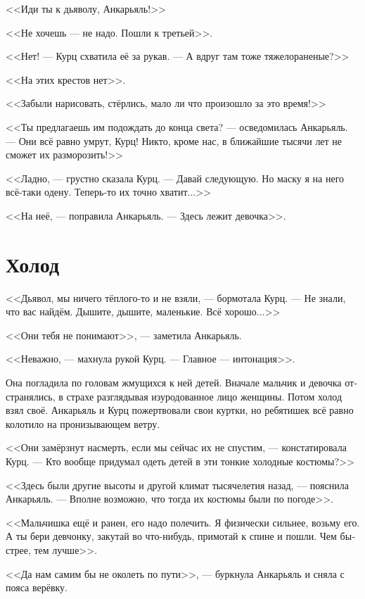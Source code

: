 \documentclass[a4paper,10pt,fleqn]{book}\usepackage{polyglossia}\setdefaultlanguage[babelshorthands=true]{russian}\setotherlanguage{english}\defaultfontfeatures{Ligatures=TeX,Mapping=tex-text}\usepackage{xcolor}\newcommand{\ml}[3]{#2}
\begin{document}
\ml{$0$}
{<<Иди ты к дьяволу, Анкарьяль!>>}
{``Fuck yourself, Angaralle!''}

\ml{$0$}
{<<Не хочешь --- не надо.}
{``Take it, or leave it.}
Пошли к третьей>>.

<<Нет! --- Курц схватила её за рукав.
--- А вдруг там тоже тяжелораненые?>>

<<На этих крестов нет>>.

<<Забыли нарисовать, стёрлись, мало ли что произошло за это время!>>

<<Ты предлагаешь им подождать до конца света? --- осведомилась Анкарьяль.
--- Они всё равно умрут, Курц!
Никто, кроме нас, в ближайшие тысячи лет не сможет их разморозить!>>

<<Ладно, --- грустно сказала Курц.
--- Давай следующую.
Но маску я на него всё-таки одену.
Теперь-то их точно хватит...>>

<<На неё, --- поправила Анкарьяль.
--- Здесь лежит девочка>>.

\section{Холод}

<<Дьявол, мы ничего тёплого-то и не взяли, --- бормотала Курц.
--- Не знали, что вас найдём.
Дышите, дышите, маленькие.
Всё хорошо...>>

<<Они тебя не понимают>>, --- заметила Анкарьяль.

<<Неважно, --- махнула рукой Курц.
--- Главное --- интонация>>.

Она погладила по головам жмущихся к ней детей.
Вначале мальчик и девочка отстранялись, в страхе разглядывая изуродованное лицо женщины.
Потом холод взял своё.
Анкарьяль и Курц пожертвовали свои куртки, но ребятишек всё равно колотило на пронизывающем ветру.

<<Они замёрзнут насмерть, если мы сейчас их не спустим, --- констатировала Курц.
--- Кто вообще придумал одеть детей в эти тонкие холодные костюмы?>>

<<Здесь были другие высоты и другой климат тысячелетия назад, --- пояснила Анкарьяль.
--- Вполне возможно, что тогда их костюмы были по погоде>>.

<<Мальчишка ещё и ранен, его надо полечить.
Я физически сильнее, возьму его.
А ты бери девчонку, закутай во что-нибудь, примотай к спине и пошли.
Чем быстрее, тем лучше>>.

<<Да нам самим бы не околеть по пути>>, --- буркнула Анкарьяль и сняла с пояса верёвку.
\end{document}
